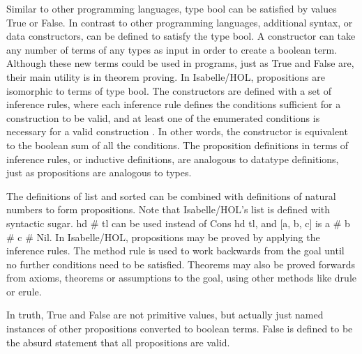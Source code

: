 \documentclass{article}
\begin{document}
	Similar to other programming languages, type bool can be satisfied by values True or False. In contrast to other programming languages, additional syntax, or data constructors, can be defined to satisfy the type bool.  A constructor can take any number of terms of any types as input in order to create a boolean term. Although these new terms could be used in programs, just as True and False are, their main utility is in theorem proving.  In Isabelle/HOL, propositions are isomorphic to terms of type bool.  The constructors are defined with a set of inference rules, where each inference rule defines the conditions sufficient for a construction to be valid, and at least one of the enumerated conditions is necessary for a valid construction .  In other words, the constructor is equivalent to the boolean sum of all the conditions.  The proposition definitions in terms of inference rules, or inductive definitions, are analogous to datatype definitions, just as propositions are analogous to types.


  The definitions of list and sorted can be combined with definitions of natural numbers to form propositions.  Note that Isabelle/HOL's list is defined with syntactic sugar. hd \# tl can be used instead of Cons hd tl, and [a, b, c] is a \# b \# c \# Nil.  In Isabelle/HOL, propositions may be proved by applying the inference rules.  The method rule is used to work backwards from the goal until no further conditions need to be satisfied.  Theorems may also be proved forwards from axioms, theorems or assumptions to the goal, using other methods like drule or erule.


  In truth, True and False are not primitive values, but actually just named instances of other propositions converted to boolean terms.   False is defined to be the absurd statement that all propositions are valid.
\end{document}
